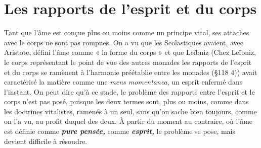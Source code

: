 \section{Les rapports de l'esprit et du corps}%
Tant que l’âme
est conçue plus ou moins comme un principe vital, ses attaches avec
le corps ne sont pas rompues. On a vu que les Scolastiques avaient, avec
Aristote, défini l’âme comme « la forme du corps » et que Leïbniz
{\scriptsize (Chez Leïbniz, le corps représentant le point de vue des autres monades les
rapports de l'esprit et du corps se ramènent à l'harmonie préétablie entre les
monades (\S 118 4))}
avait caractérisé la matière comme une {\it mens momentanea}, un esprit
enfermé dans l'instant. On peut dire qu’à ce stade, le problème des
rapports entre l'esprit et le corps n’est pas posé, puisque les deux
termes sont, plus ou moins, comme dans les doctrines vitalistes,
ramenés à un seul, sans qu’on sache bien toujours, comme on l’a vu,
au profit duquel des deux. À partir du moment au contraire, où
l’âme est définie comme \textbf{\textit {pure pensée,}} comme \textbf{\textit {esprit,}} le problème
se pose, mais devient difficile à résoudre.


